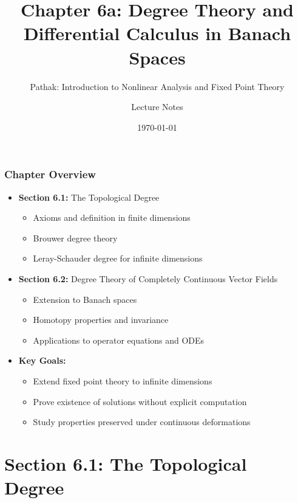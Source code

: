 \documentclass[aspectratio=169,10pt]{beamer}
\title{Chapter 6a: Degree Theory and Differential Calculus in Banach Spaces}
\subtitle{Pathak: Introduction to Nonlinear Analysis and Fixed Point Theory}
\author{Lecture Notes}
\date{\today}
\begin{document}
\frame{\titlepage}

\begin{frame}
\frametitle{Chapter Overview}
\begin{itemize}
    \item \textbf{Section 6.1:} The Topological Degree
    \begin{itemize}
        \item Axioms and definition in finite dimensions
        \item Brouwer degree theory
        \item Leray-Schauder degree for infinite dimensions
    \end{itemize}
    \vspace{0.3cm}
    \item \textbf{Section 6.2:} Degree Theory of Completely Continuous Vector Fields
    \begin{itemize}
        \item Extension to Banach spaces
        \item Homotopy properties and invariance
        \item Applications to operator equations and ODEs
    \end{itemize}
    \vspace{0.3cm}
    \item \textbf{Key Goals:}
    \begin{itemize}
        \item Extend fixed point theory to infinite dimensions
        \item Prove existence of solutions without explicit computation
        \item Study properties preserved under continuous deformations
    \end{itemize}
\end{itemize}
\end{frame}


\section{Section 6.1: The Topological Degree}
\end{document}
